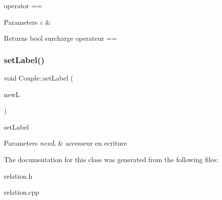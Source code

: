 operator == 


\begin{DoxyParams}{Parameters}
{\em c} & \\
\hline
\end{DoxyParams}
\begin{DoxyReturn}{Returns}
bool surcharge operateur == 
\end{DoxyReturn}
\mbox{\label{class_couple_aa2369d7e4e139a7dcba583b4688536bf}} 
\subsubsection{\texorpdfstring{set\+Label()}{setLabel()}}
{\footnotesize\ttfamily void Couple\+::set\+Label (\begin{DoxyParamCaption}\item[{const Q\+String \&}]{newL }\end{DoxyParamCaption})\hspace{0.3cm}{\ttfamily [inline]}}



set\+Label 


\begin{DoxyParams}{Parameters}
{\em newL} & accesseur en ecriture \\
\hline
\end{DoxyParams}


The documentation for this class was generated from the following files\+:\begin{DoxyCompactItemize}
\item 
relation.\+h\item 
relation.\+cpp\end{DoxyCompactItemize}
